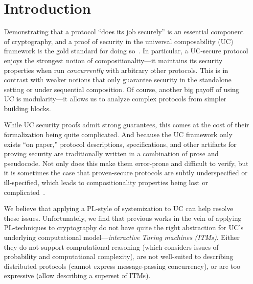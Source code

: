 \section{Introduction}
\label{sec:introduction}

Demonstrating that a protocol ``does its job securely'' is an essential
component of cryptography, and a proof of security in the universal
composability (UC) framework is the gold standard for doing
so~\cite{canetti2001universally}. In particular, a UC-secure protocol enjoys the
strongest notion of compositionality---it maintains its security properties when
run \emph{concurrently} with arbitrary other protocols. This is in contrast with
weaker notions that only guarantee security in the standalone setting or under
sequential composition. Of course, another big payoff of using UC is
modularity---it allows us to analyze complex protocols from simpler building
blocks.

\begin{comment}
In a nutshell, security proofs in UC follow the real/ideal
paradigm~\cite{goldreich1987play}. The security requirements of a given task are
defined as a program for a \emph{single trusted process} called an \emph{ideal
  functionality}, which runs in an imagined ideal world. This serves as a
specification of the desired security properties for a distributed protocol
achieving the task across \emph{many unstrusted processes}, which runs in the
real world. Roughly speaking, we say that a protocol $\pi$ \emph{emulates} an
ideal functionality $\mc{F}$ (i.e., it meets its specification) if every
adversarial behavior in the real world can also be exhibited in the ideal world.
\end{comment}

While UC security proofs admit strong guarantees, this comes at the cost of
their formalization being quite complicated. And because the UC framework only
exists ``on paper,'' protocol descriptions, specifications, and other artifacts
for proving security are traditionally written in a combination of prose and
pseudocode. Not only does this make them error-prone and difficult to verify,
but it is sometimes the case that proven-secure protocols are subtly
underspecified or ill-specified, which leads to compositionality properties
being lost or complicated~\cite{camenisch2016universal}.

We believe that applying a PL-style of systemization to UC can help resolve
these issues. Unfortunately, we find that previous works in the vein of applying
PL-techniques to cryptography do not have quite the right abstraction for UC's
underlying computational model---\emph{interactive Turing machines (ITMs)}. Either
they do not support computational reasoning (which considers issues of
probability and computational complexity), are not well-suited to describing
distributed protocols (cannot express message-passing concurrency), or are too
expressive (allow describing a superset of ITMs).

